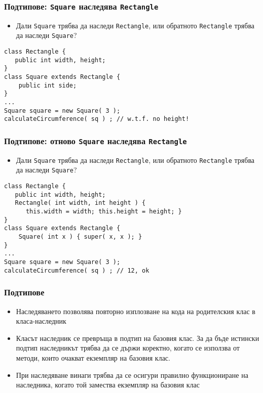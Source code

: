 \documentclass[ignorenonframetext, hyperref=unicode,compress,pdflatex]{beamer}
\begin{document}
\begin{frame}[containsverbatim]\frametitle{Подтипове: \lstinline{Square} наследява \lstinline{Rectangle}}
\begin{itemize}
\item Дали \lstinline{Square} трябва да наследи \lstinline{Rectangle}, или обратното \lstinline{Rectangle} трябва да наследи \lstinline{Square}?
\end{itemize}
\begin{lstlisting}
class Rectangle { 
   public int width, height;
}
class Square extends Rectangle {
    public int side;
}
...
Square square = new Square( 3 );
calculateCircumference( sq ) ; // w.t.f. no height!
\end{lstlisting}
\end{frame}

\begin{frame}[containsverbatim]\frametitle{Подтипове: отново \lstinline{Square} наследява \lstinline{Rectangle}}
\begin{itemize}
\item Дали \lstinline{Square} трябва да наследи \lstinline{Rectangle}, или обратното \lstinline{Rectangle} трябва да наследи \lstinline{Square}?
\end{itemize}
\begin{lstlisting}
class Rectangle {
   public int width, height;
   Rectangle( int width, int height ) {
      this.width = width; this.height = height; }
}
class Square extends Rectangle {
    Square( int x ) { super( x, x ); }
}
...
Square square = new Square( 3 );
calculateCircumference( sq ) ; // 12, ok
\end{lstlisting}
\end{frame}

\begin{frame}[containsverbatim]\frametitle{Подтипове}
\begin{itemize}
\item Наследяването позволява повторно изплозване на кода на родителския клас в класа-наследник
\item Класът наследник се превръща в подтип на базовия клас. За да бъде истински подтип наследникът трябва да се държи коректно, когато се използва от методи, които очакват екземпляр на базовия клас.
\item При наследяване винаги трябва да се осигури правилно функциониране на наследника, когато той замества екземпляр на базовия клас
\end{itemize}
\end{frame}
\end{document}
